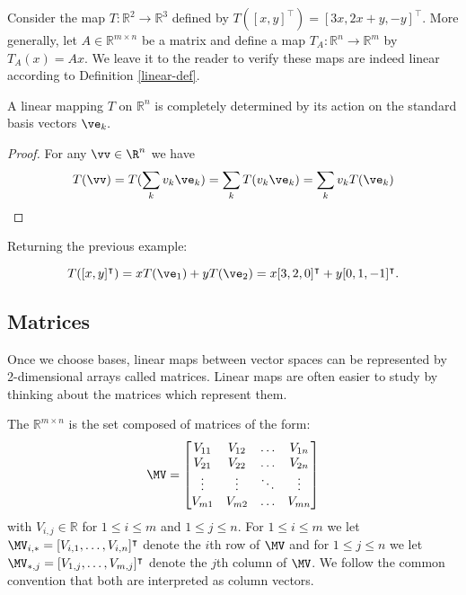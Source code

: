 \begin{example}\label{lin-map-ex}
Consider the map $T : \mathbb R^2 \to \mathbb R^3$ defined by
$T([x,y]^\intercal)=[3x, 2x + y, -y]^\intercal$.
More generally, let $A\in\mathbb{R}^{m\times n}$ be a matrix and define a map $T_A:\mathbb{R}^n\to\mathbb{R}^m$ by $T_A(x)=Ax$. 
We leave it to the reader to verify these maps are indeed linear according to Definition \ref{linear-def}. 
\end{example}

\begin{proposition} 
A linear mapping $T$ on $\mathbb R^n$ is completely determined by its action on the standard basis vectors $\ve_k.$
\end{proposition}

\begin{proof} For any $\vv\in\R^n$ we have
$$
T(\vv) = 
T(\sum_{k } v_k \ve_k) = 
\sum_k T(v_k \ve_k) = 
\sum_k v_k T(\ve_k)\qedhere
$$
\end{proof}

\begin{example}
Returning the previous example: 

$$T([x,y]^\intercal) = x T(\ve_1) + y T(\ve_2) = x [3,2,0]^\intercal
+ y [0,1,-1]^\intercal. $$
\end{example}

\subsection{Matrices}\label{matrix-section}

Once we choose bases, linear maps between vector spaces can be represented by 2-dimensional arrays called matrices. Linear maps are often easier to study by thinking about the matrices which represent them. 

\begin{definition}
The  $\mathbb R^{m \times n}$ is the set composed of matrices of the form: 
$$
\MV =
\begin{bmatrix}
V_{11} & V_{12} & \ldots & V_{1n} \\
V_{21} & V_{22} & \ldots & V_{2n} \\
\vdots & \vdots & \ddots & \vdots \\
V_{m1} & V_{m2} & \ldots & V_{mn} \\
\end{bmatrix} $$
with $V_{i,j} \in \mathbb R$ for $1\leq i\leq m$ and $1\leq j\leq n$. For $1\leq i\leq m$ we let $\MV_{i,*} = [V_{i,1},\dots,V_{i,n}]^\intercal$ denote the $i$th row of $\MV$ and for $1\leq j\leq n$ we let $\MV_{*,j} = [V_{1,j},\dots,V_{m,j}]^\intercal$ denote the $j$th column of $\MV$. We follow the common convention that both are interpreted as column vectors.
\end{definition}

